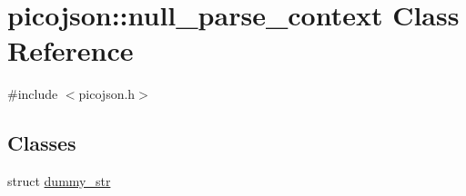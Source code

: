 \hypertarget{classpicojson_1_1null__parse__context}{}\section{picojson\+:\+:null\+\_\+parse\+\_\+context Class Reference}
\label{classpicojson_1_1null__parse__context}


{\ttfamily \#include $<$picojson.\+h$>$}

\subsection*{Classes}
\begin{DoxyCompactItemize}
\item 
struct \hyperlink{structpicojson_1_1null__parse__context_1_1dummy__str}{dummy\+\_\+str}
\end{DoxyCompactItemize}
